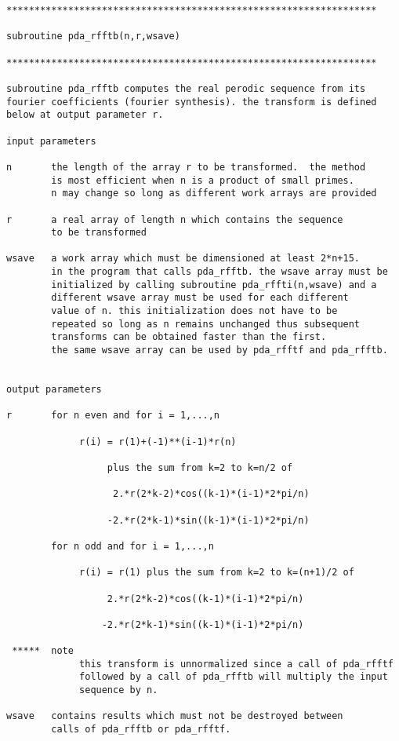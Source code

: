 \begin{verbatim}
******************************************************************

subroutine pda_rfftb(n,r,wsave)

******************************************************************

subroutine pda_rfftb computes the real perodic sequence from its
fourier coefficients (fourier synthesis). the transform is defined
below at output parameter r.

input parameters

n       the length of the array r to be transformed.  the method
        is most efficient when n is a product of small primes.
        n may change so long as different work arrays are provided

r       a real array of length n which contains the sequence
        to be transformed

wsave   a work array which must be dimensioned at least 2*n+15.
        in the program that calls pda_rfftb. the wsave array must be
        initialized by calling subroutine pda_rffti(n,wsave) and a
        different wsave array must be used for each different
        value of n. this initialization does not have to be
        repeated so long as n remains unchanged thus subsequent
        transforms can be obtained faster than the first.
        the same wsave array can be used by pda_rfftf and pda_rfftb.


output parameters

r       for n even and for i = 1,...,n

             r(i) = r(1)+(-1)**(i-1)*r(n)

                  plus the sum from k=2 to k=n/2 of

                   2.*r(2*k-2)*cos((k-1)*(i-1)*2*pi/n)

                  -2.*r(2*k-1)*sin((k-1)*(i-1)*2*pi/n)

        for n odd and for i = 1,...,n

             r(i) = r(1) plus the sum from k=2 to k=(n+1)/2 of

                  2.*r(2*k-2)*cos((k-1)*(i-1)*2*pi/n)

                 -2.*r(2*k-1)*sin((k-1)*(i-1)*2*pi/n)

 *****  note
             this transform is unnormalized since a call of pda_rfftf
             followed by a call of pda_rfftb will multiply the input
             sequence by n.

wsave   contains results which must not be destroyed between
        calls of pda_rfftb or pda_rfftf.
\end{verbatim}

